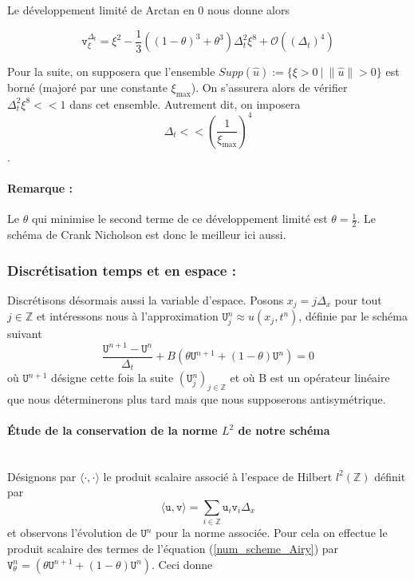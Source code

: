 \documentclass[12pt,a4paper]{article}
\numberwithin{equation}{section}
\begin{document}
Le développement limité de Arctan en 0 nous donne alors

\begin{equation}
    \texttt{v}_\xi^{\Delta_t} = \xi^2 - \frac{1}{3}\left((1-\theta)^3+\theta^3\right)\Delta_t^2\xi^8 + \mathcal{O}((\Delta_t)^4) 
\end{equation}

Pour la suite, on supposera que l'ensemble $Supp(\hat{u}):=\{\xi > 0 ~|~ \|\hat{u}\|>0\}$ est borné (majoré par une constante $\xi_\text{max}$). On s'assurera alors de vérifier $\Delta_t^2\xi^8 << 1$ dans cet ensemble. Autrement dit, on imposera $$\Delta_t << \left(\frac{1}{\xi_\text{max}}\right)^4$$.
\paragraph{Remarque :} Le $\theta$ qui minimise le second terme de ce développement limité est $\theta = \frac{1}{2}$. Le schéma de Crank Nicholson est donc le meilleur ici aussi.

\subsubsection{Discrétisation temps et en espace :}
Discrétisons désormais aussi la variable d'espace. Posons $x_j = j\Delta_x$ pour tout $j\in\mathbb{Z}$ et intéressons nous à l'approximation $\texttt{U}^n_j \approx u(x_j,t^n)$, définie par le schéma suivant
\begin{equation}
\frac{\texttt{U}^{n+1}-\texttt{U}^n}{\Delta_t} + B(\theta\texttt{U}^{n+1} + (1-\theta)\texttt{U}^{n}) = 0 \label{num_scheme_Airy}
\end{equation}
où $\texttt{U}^{n+1}$ désigne cette fois la suite $(\texttt{U}^n_j)_{j\in\mathbb{Z}}$ et où B est un opérateur linéaire que nous déterminerons plus tard mais que nous supposerons antisymétrique.\\

\paragraph{Étude de la conservation de la norme $L^2$ de notre schéma}\,\\

Désignons par $\langle\cdot,\cdot\rangle $ le produit scalaire associé à l'espace de Hilbert $l^2(\mathbb{Z})$ définit par $$\langle\texttt{u},\texttt{v} \rangle  = \sum\limits_{i\in\mathbb{Z}}\texttt{u}_i\texttt{v}_i\Delta_x$$ et observons l'évolution de $\texttt{U}^n$ pour la norme associée. Pour cela on effectue le produit scalaire des termes de l'équation (\ref{num_scheme_Airy}) par $ \texttt{V}^n_\theta = (\theta\texttt{U}^{n+1} + (1-\theta)\texttt{U}^{n})$. Ceci donne
\end{document}
